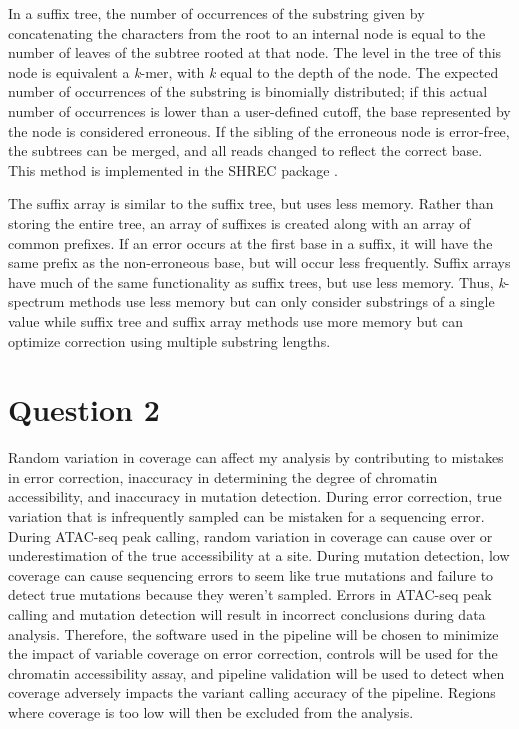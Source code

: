 In a suffix tree, the number of occurrences of the substring given by concatenating the characters from the root to an internal node is equal to the number of leaves of the subtree rooted at that node. The level in the tree of this node is equivalent a \textit{k}-mer, with \textit{k} equal to the depth of the node. The expected number of occurrences of the substring is binomially distributed; if this actual number of occurrences is lower than a user-defined cutoff, the base represented by the node is considered erroneous. If the sibling of the erroneous node is error-free, the subtrees can be merged, and all reads changed to reflect the correct base. This method is implemented in the SHREC package \parencite{schroder_shrec:_2009}.

The suffix array is similar to the suffix tree, but uses less memory. Rather than storing the entire tree, an array of suffixes is created along with an array of common prefixes. If an error occurs at the first base in a suffix, it will have the same prefix as the non-erroneous base, but will occur less frequently. Suffix arrays have much of the same functionality as suffix trees, but use less memory.
Thus, \textit{k}-spectrum methods use less memory but can only consider substrings of a single value while suffix tree and suffix array methods use more memory but can optimize correction using multiple substring lengths.

\section{Question 2}
Random variation in coverage can affect my analysis by contributing to mistakes in error correction, inaccuracy in determining the degree of chromatin accessibility, and inaccuracy in mutation detection. During error correction, true variation that is infrequently sampled can be mistaken for a sequencing error. During ATAC-seq peak calling, random variation in coverage can cause over or underestimation of the true accessibility at a site. During mutation detection, low coverage can cause sequencing errors to seem like true mutations and failure to detect true mutations because they weren't sampled. Errors in ATAC-seq peak calling and mutation detection will result in incorrect conclusions during data analysis. Therefore, the software used in the pipeline will be chosen to minimize the impact of variable coverage on error correction, controls will be used for the chromatin accessibility assay, and pipeline validation will be used to detect when coverage adversely impacts the variant calling accuracy of the pipeline. Regions where coverage is too low will then be excluded from the analysis.

